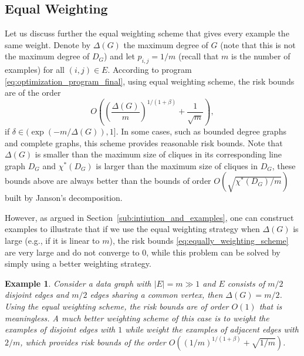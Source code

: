 \documentclass[letterpaper]{article} %
\newtheorem{example}{Example}
\newcommand{\pair}[1]{(#1)}
\newcommand{\fcoloring}{\chi^*}
\newcommand{\complexbound}{\beta}
\newcommand{\red}[1]{\textcolor{red}{#1}}
\newcommand{\todo}[1]{\red{\textsc{todo:} #1}}
\begin{document}
\subsection{Equal Weighting} %
\label{sub:equally_weighting}
Let us discuss further the equal weighting scheme that gives every example the same weight. Denote by $\Delta(G)$ the maximum degree of $G$ (note that this is not the maximum degree of $D_G$) and let $p_{i,j}=1/m$ (recall that $m$ is the number of examples) for all $\pair{i,j}\in E$. According to program \eqref{eq:optimization_program_final},
using equal weighting scheme, the risk bounds are of the order 
\begin{equation}
\label{eq:equally_weighting_scheme}
    O((\frac{\Delta(G)}{m})^{1/(1+\complexbound{})} + \frac{1}{\sqrt{m}}),
\end{equation}
if $\delta\in (\exp(-m/\Delta(G)),1]$. In some cases, such as bounded degree graphs and complete graphs, this scheme provides reasonable risk bounds.
Note that $\Delta(G)$ is smaller than the maximum size of cliques in its corresponding line graph $D_G$ and $\fcoloring{}(D_G)$ is larger than the maximum size of cliques in $D_G$, these bounds above are always better than the bounds of order $O(\sqrt{\fcoloring{}(D_G)/m})$ built by Janson's decomposition. 

However, as argued in Section~\ref{sub:intiution_and_examples},
one can construct examples to illustrate that if we use the equal weighting strategy when $\Delta(G)$ is large (e.g., if it is linear to $m$), the risk bounds \eqref{eq:equally_weighting_scheme} are very large and do not converge to $0$, while this problem can be solved by simply using a better weighting strategy. 
\begin{example}
Consider a data graph with $|E|=m \gg 1$ and $E$ consists of $m/2$ disjoint edges and $m/2$ edges sharing a common vertex, then $\Delta(G)=m/2$. Using the equal weighting scheme, the risk bounds are of order $O(1)$ that is meaningless. A much better weighting scheme of this case is to weight the examples of disjoint edges with $1$ while weight the examples of adjacent edges with $2/m$, which provides risk bounds of the order $O\left((1/m)^{1/(1+\complexbound{})} + \sqrt{1/m}\right)$. %
\end{example}
\end{document}
